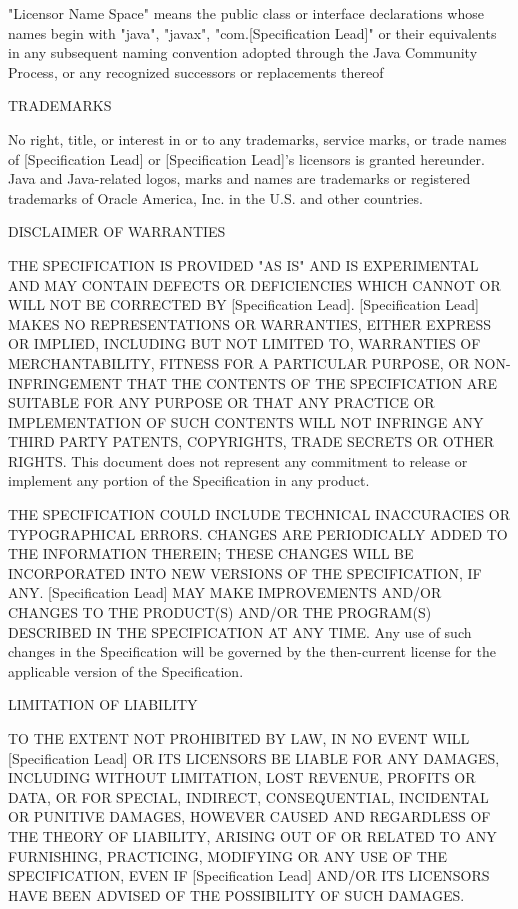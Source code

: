 \begin{flushleft}
"Licensor Name Space" means the public class or interface declarations whose names begin with "java", "javax", "com.[Specification Lead]" or their equivalents in any subsequent naming convention adopted through the Java Community Process, or any recognized successors or replacements thereof

TRADEMARKS

No right, title, or interest in or to any trademarks, service marks, or trade names of [Specification Lead] or [Specification Lead]'s licensors is granted hereunder. Java and Java-related logos, marks and names are trademarks or registered trademarks of Oracle America, Inc. in the U.S. and other countries.

DISCLAIMER OF WARRANTIES

THE SPECIFICATION IS PROVIDED "AS IS" AND IS EXPERIMENTAL AND MAY CONTAIN DEFECTS OR DEFICIENCIES WHICH CANNOT OR WILL NOT BE CORRECTED BY [Specification Lead]. [Specification Lead] MAKES NO REPRESENTATIONS OR WARRANTIES, EITHER EXPRESS OR IMPLIED, INCLUDING BUT NOT LIMITED TO, WARRANTIES OF MERCHANTABILITY, FITNESS FOR A PARTICULAR PURPOSE, OR NON-INFRINGEMENT THAT THE CONTENTS OF THE SPECIFICATION ARE SUITABLE FOR ANY PURPOSE OR THAT ANY PRACTICE OR IMPLEMENTATION OF SUCH CONTENTS WILL NOT INFRINGE ANY THIRD PARTY PATENTS, COPYRIGHTS, TRADE SECRETS OR OTHER RIGHTS. This document does not represent any commitment to release or implement any portion of the Specification in any product.

THE SPECIFICATION COULD INCLUDE TECHNICAL INACCURACIES OR TYPOGRAPHICAL ERRORS. CHANGES ARE PERIODICALLY ADDED TO THE INFORMATION THEREIN; THESE CHANGES WILL BE INCORPORATED INTO NEW VERSIONS OF THE SPECIFICATION, IF ANY. [Specification Lead] MAY MAKE IMPROVEMENTS AND/OR CHANGES TO THE PRODUCT(S) AND/OR THE PROGRAM(S) DESCRIBED IN THE SPECIFICATION AT ANY TIME. Any use of such changes in the Specification will be governed by the then-current license for the applicable version of the Specification.

LIMITATION OF LIABILITY

TO THE EXTENT NOT PROHIBITED BY LAW, IN NO EVENT WILL [Specification Lead] OR ITS LICENSORS BE LIABLE FOR ANY DAMAGES, INCLUDING WITHOUT LIMITATION, LOST REVENUE, PROFITS OR DATA, OR FOR SPECIAL, INDIRECT, CONSEQUENTIAL, INCIDENTAL OR PUNITIVE DAMAGES, HOWEVER CAUSED AND REGARDLESS OF THE THEORY OF LIABILITY, ARISING OUT OF OR RELATED TO ANY FURNISHING, PRACTICING, MODIFYING OR ANY USE OF THE SPECIFICATION, EVEN IF [Specification Lead] AND/OR ITS LICENSORS HAVE BEEN ADVISED OF THE POSSIBILITY OF SUCH DAMAGES.


\end{flushleft}
